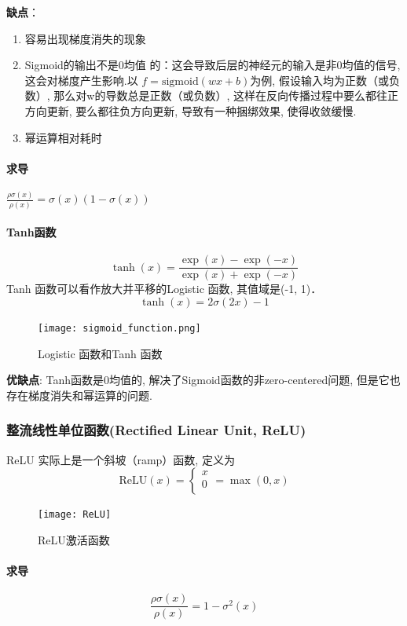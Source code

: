 \textbf{缺点}：
\begin{enumerate}
    \renewcommand{\labelenumi}{(\theenumi)}
    \item 容易出现梯度消失的现象 
   \item Sigmoid的输出不是0均值 的：这会导致后层的神经元的输入是非0均值的信号, 这会对梯度产生影响.以 $f=\mathrm{sigmoid}(wx+b)$为例,  假设输入均为正数（或负数）, 那么对w的导数总是正数（或负数）, 这样在反向传播过程中要么都往正方向更新, 要么都往负方向更新, 导致有一种捆绑效果, 使得收敛缓慢.
    \item 幂运算相对耗时 
\end{enumerate}
\paragraph{求导}
$ \frac{\rho \sigma(x)}{\rho(x)}=\sigma(x)(1-\sigma(x))$
​	 
\paragraph{Tanh函数}
$$\tanh(x)=\frac{\exp(x)-\exp(-x)}{\exp(x)+\exp(-x)} $$
Tanh 函数可以看作放大并平移的Logistic 函数, 其值域是(-1,  1)．
$$\tanh(x) = 2 \sigma (2x)-1$$

\begin{figure}[!ht]
    \centering
    \texttt{[image: sigmoid\_function.png]}
    \caption{Logistic 函数和Tanh 函数}
\end{figure}

\textbf{优缺点}:
Tanh函数是0均值的, 解决了Sigmoid函数的非zero-centered问题, 但是它也存在梯度消失和幂运算的问题.


\subsubsection{整流线性单位函数(Rectified Linear Unit,  ReLU)}
ReLU 实际上是一个斜坡（ramp）函数, 定义为
$$\mathrm{ReLU}(x)=
\left\{ 
\begin{array}{c}    x \\    0  \\   \end{array}
\right. =\max(0, x)
$$
\begin{figure}[!ht]
    \centering
    \texttt{[image: ReLU]}
    \caption{ReLU激活函数}
\end{figure}
\paragraph{求导}
$$\frac{\rho\sigma(x)}{\rho(x)}=1-\sigma^2(x)$$

